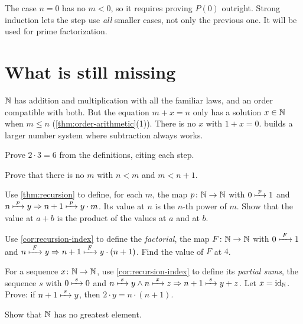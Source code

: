 The case $n = 0$ has no $m < 0$, so it requires proving $P(0)$ outright. Strong
induction lets the step use \emph{all} smaller cases, not only the previous one. It
will be used for prime factorization.

\section{What is still missing}

$\mathbb{N}$ has addition and multiplication with all the familiar laws, and an order
compatible with both. But the equation $m + x = n$ only has a solution $x \in \mathbb{N}$
when $m \le n$ (\cref{thm:order-arithmetic}(1)). There is no $x$ with $1 + x = 0$.
 builds a larger number system where subtraction always works.

\begin{exercises}
  \item Prove $2 \cdot 3 = 6$ from the definitions, citing each step.
  \item Prove that there is no $m$ with $n < m$ and $m < n + 1$.
  \item Use \cref{thm:recursion} to define, for each $m$, the map $p \colon \mathbb{N} \to
    \mathbb{N}$ with $0 \xmapsto{\;p\;} 1$ and $n \xmapsto{\;p\;} y \Rightarrow n + 1 \xmapsto{\;p\;} y \cdot m$.
    Its value at $n$ is the $n$-th power of $m$. Show that the value at $a + b$ is
    the product of the values at $a$ and at $b$.
  \item Use \cref{cor:recursion-index} to define the \emph{factorial}, the map $F
    \colon \mathbb{N} \to \mathbb{N}$ with $0 \xmapsto{\;F\;} 1$ and $n \xmapsto{\;F\;} y \Rightarrow n + 1 \xmapsto{\;F\;}
    y \cdot (n + 1)$. Find the value of $F$ at $4$.
  \item For a sequence $x \colon \mathbb{N} \to \mathbb{N}$, use \cref{cor:recursion-index} to
    define its \emph{partial sums}, the sequence $s$ with $0 \xmapsto{\;s\;} 0$ and $n
    \xmapsto{\;s\;} y \land n \xmapsto{\;x\;} z \Rightarrow n + 1 \xmapsto{\;s\;} y + z$. Let $x = \mathrm{id}_{\mathbb{N}}$.
    Prove: if $n + 1 \xmapsto{\;s\;} y$, then $2 \cdot y = n \cdot (n + 1)$.
  \item Show that $\mathbb{N}$ has no greatest element.
\end{exercises}

